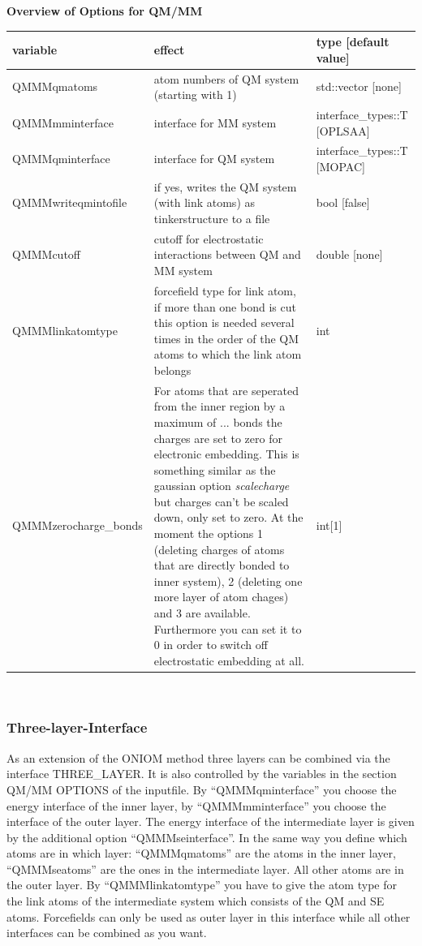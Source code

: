 \documentclass[10pt,a4paper]{article} %
\begin{document}
\textbf{Overview of Options for QM/MM\\}
			\begin{longtable}{|p{3.7cm}|p{5cm}|p{3cm}|}
		variable & effect & type [default value] \\
		\hline
			QMMMqmatoms  & atom numbers of QM system (starting with 1) & std::vector [none]\\
			QMMMmminterface  & interface for MM system & interface\_types::T [OPLSAA]\\
			QMMMqminterface & interface for QM system & interface\_types::T [MOPAC]\\
			QMMMwriteqmintofile & if yes, writes the QM system (with link atoms) as tinkerstructure to a file  &  bool [false]\\
            QMMMcutoff & cutoff for electrostatic interactions between QM and MM system & double [none]\\
			QMMMlinkatomtype   & forcefield type for link atom, if more than one bond is cut this option is needed several times in the order of the QM atoms to which the link atom belongs & int \\
			QMMMzerocharge\_bonds   & For atoms that are seperated from the inner region by a maximum of ... bonds the charges are set to zero for electronic embedding. This is something similar as the gaussian option \textit{scalecharge} but charges can't be scaled down, only set to zero. At the moment the options 1 (deleting charges of atoms that are directly bonded to inner system), 2 (deleting one more layer of atom chages) and 3 are available. Furthermore you can set it to 0 in order to switch off electrostatic embedding at all. & int[1] \\
		\end{longtable}~\\
	
\subsubsection{Three-layer-Interface}

As an extension of the ONIOM method three layers can be combined via the interface THREE\_LAYER. It is also controlled by the variables in the section QM/MM OPTIONS of the inputfile. By ``QMMMqminterface'' you choose the energy interface of the inner layer, by ``QMMMmminterface'' you choose the interface of the outer layer. The energy interface of the intermediate layer is given by the additional option ``QMMMseinterface''. In the same way you define which atoms are in which layer: ``QMMMqmatoms'' are the atoms in the inner layer, ``QMMMseatoms'' are the ones in the intermediate layer. All other atoms are in the outer layer. By ``QMMMlinkatomtype'' you have to give the atom type for the link atoms of the intermediate system which consists of the QM and SE atoms. Forcefields can only be used as outer layer in this interface while all other interfaces can be combined as you want. 
\end{document}
